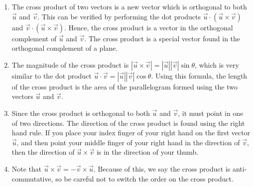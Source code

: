 \begin{enumerate}
\item
The cross product of two vectors is a new vector which is orthogonal to both $\vec u$ and $\vec v$. This can be verified by performing the dot products $\vec u \cdot (\vec u \times \vec v)$ and $\vec v \cdot (\vec u \times \vec v)$. Hence, the cross product is a vector in the orthogonal complement of $\vec u$ and $\vec v$. The cross product is a special vector found in the orthogonal complement of a plane.

\item
The magnitude of the cross product is {$|\vec u \times \vec v| = |\vec u||\vec v|\sin\theta$}, which is very similar to the dot product $\vec u\cdot \vec v = |\vec u||\vec v|\cos\theta$. 
Using this formula, the length of the cross product is the area of the parallelogram formed using the two vectors $\vec u$ and $\vec v$.



%
\item Since the cross product is orthogonal to both $\vec u$ and $\vec v$, it must point in one of two directions. The direction of the cross product is found using the right hand rule. If you place your index finger of your right hand on the first vector $\vec u$, and then point your middle finger of your right hand in the direction of $\vec v$, then the direction of $\vec u\times\vec v$ is in the direction of your thumb. 

\item Note that {$\vec u\times \vec v = - \vec v\times \vec u$}. Because of this, we say the cross product is anti-commutative, so be careful not to switch the order on the cross product. 

\end{enumerate}


